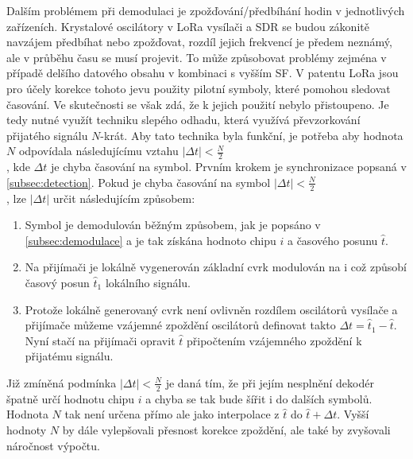 \documentclass{ctuthesis}
\begin{document}
Dalším problémem při demodulaci je zpožďování/předbíhání hodin v jednotlivých zařízeních. Krystalové oscilátory v LoRa vysílači a SDR se budou zákonitě navzájem předbíhat nebo zpožďovat, rozdíl jejich frekvencí je předem neznámý, ale v průběhu času se musí projevit. To může způsobovat problémy zejména v případě delšího datového obsahu v kombinaci s vyšším SF. V patentu LoRa jsou pro účely korekce tohoto jevu použity pilotní symboly, které pomohou sledovat časování. Ve skutečnosti se však zdá, že k jejich použití nebylo přistoupeno. Je tedy nutné využít techniku slepého odhadu, která využívá převzorkování přijatého signálu $N$-krát. Aby tato technika byla funkční, je potřeba aby hodnota $N$ odpovídala následujícímu vztahu $\lvert\Delta t \rvert < \frac{N}{2}$\\, kde $\Delta t$ je chyba časování na symbol.
Prvním krokem je synchronizace popsaná v \ref{subsec:detection}. Pokud je chyba časování na symbol  $\lvert\Delta t \rvert < \frac{N}{2}$\\, lze $\lvert\Delta t \rvert$ určit následujícím způsobem:
\begin{enumerate}
\item
Symbol je demodulován běžným způsobem, jak je popsáno v \ref{subsec:demodulace} a je tak získána hodnoto chipu $i$  a časového posunu $\hat{t}$.
\item
Na přijímači je lokálně vygenerován základní cvrk modulován na i což způsobí časový posun $\hat{t}_1$ lokálního signálu.
\item
Protože lokálně generovaný cvrk není ovlivněn rozdílem oscilátorů vysílače a přijímače můžeme vzájemné zpoždění oscilátorů definovat takto $\Delta t = \hat{t}_1 - \hat{t}$. Nyní stačí na přijímači opravit $\hat{t}$ připočtením vzájemného zpoždění k přijatému signálu.
\end{enumerate}
Již zmíněná podmínka $\lvert\Delta t \rvert < \frac{N}{2}$ je daná tím, že při jejím nesplnění dekodér špatně určí hodnotu chipu $i$ a chyba se tak bude šířit i do dalších symbolů. Hodnota $N$ tak není určena přímo ale jako interpolace z $\hat{t}$ do $\hat{t} + \Delta t$. Vyšší hodnoty $N$ by dále vylepšovali přesnost korekce zpoždění, ale také by zvyšovali náročnost výpočtu.
\end{document}
